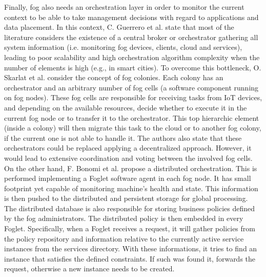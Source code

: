 Finally, fog also needs an orchestration layer in order to monitor the current context to be able to take management decisions with regard to applications and data placement. In this context, C. Guerrero et al. \cite{guerrero2018influence} state that most of the literature considers the existence of a central broker or orchestrator gathering all system information (i.e. monitoring fog devices, clients, cloud and services), leading to poor scalability and high orchestration algorithm complexity when the number of elements is high (e.g., in smart cities). To overcome this bottleneck, O. Skarlat et al. \cite{skarlat2016resource,skarlat2017optimized} consider the concept of fog colonies. Each colony has an orchestrator and an arbitrary number of fog cells (a software component running on fog nodes). These fog cells are responsible for receiving tasks from IoT devices, and depending on the available resources, decide whether to execute it in the current fog node or to transfer it to the orchestrator. This top hierarchic element (inside a colony) will then migrate this task to the cloud or to another fog colony, if the current one is not able to handle it. The authors also state that these orchestrators could be replaced applying a decentralized approach. However, it would lead to extensive coordination and voting between the involved fog cells. On the other hand, F. Bonomi et al. \cite{bonomi2014fog} propose a distributed orchestration. This is performed implementing a Foglet software agent in each fog node. It has small footprint yet capable of monitoring machine's health and state. This information is then pushed to the distributed and persistent storage for global processing. The distributed database is also responsible for storing business policies defined by the fog administrators. The distributed policy is then embedded in every Foglet. Specifically, when a Foglet receives a request, it will gather policies from the policy repository and information relative to the currently active service instances from the services directory. With these informations, it tries to find an instance that satisfies the defined constraints. If such was found it, forwards the request, otherwise a new instance needs to be created.\\[6pt]
